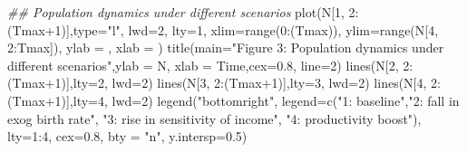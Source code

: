 \documentclass[
  letterpaper,
  DIV=11,
  numbers=noendperiod]{scrreprt}
\newenvironment{Shaded}{\begin{snugshade}}{\end{snugshade}}
\newcommand{\AttributeTok}[1]{\textcolor[rgb]{0.40,0.45,0.13}{#1}}
\newcommand{\DecValTok}[1]{\textcolor[rgb]{0.68,0.00,0.00}{#1}}
\newcommand{\DocumentationTok}[1]{\textcolor[rgb]{0.37,0.37,0.37}{\textit{#1}}}
\newcommand{\FloatTok}[1]{\textcolor[rgb]{0.68,0.00,0.00}{#1}}
\newcommand{\FunctionTok}[1]{\textcolor[rgb]{0.28,0.35,0.67}{#1}}
\newcommand{\NormalTok}[1]{\textcolor[rgb]{0.00,0.23,0.31}{#1}}
\newcommand{\SpecialCharTok}[1]{\textcolor[rgb]{0.37,0.37,0.37}{#1}}
\newcommand{\StringTok}[1]{\textcolor[rgb]{0.13,0.47,0.30}{#1}}
\begin{document}
\begin{Shaded}
\begin{Highlighting}[]
\DocumentationTok{\#\# Population dynamics under different scenarios}
\FunctionTok{plot}\NormalTok{(N[}\DecValTok{1}\NormalTok{, }\DecValTok{2}\SpecialCharTok{:}\NormalTok{(Tmax}\SpecialCharTok{+}\DecValTok{1}\NormalTok{)],}\AttributeTok{type=}\StringTok{"l"}\NormalTok{, }\AttributeTok{lwd=}\DecValTok{2}\NormalTok{, }\AttributeTok{lty=}\DecValTok{1}\NormalTok{, }\AttributeTok{xlim=}\FunctionTok{range}\NormalTok{(}\DecValTok{0}\SpecialCharTok{:}\NormalTok{(Tmax)), }\AttributeTok{ylim=}\FunctionTok{range}\NormalTok{(N[}\DecValTok{4}\NormalTok{, }\DecValTok{2}\SpecialCharTok{:}\NormalTok{Tmax]), }\AttributeTok{ylab =} \StringTok{\textquotesingle{}\textquotesingle{}}\NormalTok{, }\AttributeTok{xlab =} \StringTok{\textquotesingle{}\textquotesingle{}}\NormalTok{)}
\FunctionTok{title}\NormalTok{(}\AttributeTok{main=}\StringTok{"Figure 3: Population dynamics under different scenarios"}\NormalTok{,}\AttributeTok{ylab =} \StringTok{\textquotesingle{}N\textquotesingle{}}\NormalTok{, }\AttributeTok{xlab =} \StringTok{\textquotesingle{}Time\textquotesingle{}}\NormalTok{,}\AttributeTok{cex=}\FloatTok{0.8}\NormalTok{, }\AttributeTok{line=}\DecValTok{2}\NormalTok{)}
\FunctionTok{lines}\NormalTok{(N[}\DecValTok{2}\NormalTok{, }\DecValTok{2}\SpecialCharTok{:}\NormalTok{(Tmax}\SpecialCharTok{+}\DecValTok{1}\NormalTok{)],}\AttributeTok{lty=}\DecValTok{2}\NormalTok{, }\AttributeTok{lwd=}\DecValTok{2}\NormalTok{)}
\FunctionTok{lines}\NormalTok{(N[}\DecValTok{3}\NormalTok{, }\DecValTok{2}\SpecialCharTok{:}\NormalTok{(Tmax}\SpecialCharTok{+}\DecValTok{1}\NormalTok{)],}\AttributeTok{lty=}\DecValTok{3}\NormalTok{, }\AttributeTok{lwd=}\DecValTok{2}\NormalTok{)}
\FunctionTok{lines}\NormalTok{(N[}\DecValTok{4}\NormalTok{, }\DecValTok{2}\SpecialCharTok{:}\NormalTok{(Tmax}\SpecialCharTok{+}\DecValTok{1}\NormalTok{)],}\AttributeTok{lty=}\DecValTok{4}\NormalTok{, }\AttributeTok{lwd=}\DecValTok{2}\NormalTok{)}
\FunctionTok{legend}\NormalTok{(}\StringTok{"bottomright"}\NormalTok{, }\AttributeTok{legend=}\FunctionTok{c}\NormalTok{(}\StringTok{"1: baseline"}\NormalTok{,}\StringTok{"2: fall in exog birth rate"}\NormalTok{, }\StringTok{"3: rise in sensitivity of income"}\NormalTok{,}
      \StringTok{"4: productivity boost"}\NormalTok{), }\AttributeTok{lty=}\DecValTok{1}\SpecialCharTok{:}\DecValTok{4}\NormalTok{, }\AttributeTok{cex=}\FloatTok{0.8}\NormalTok{, }\AttributeTok{bty =} \StringTok{"n"}\NormalTok{, }\AttributeTok{y.intersp=}\FloatTok{0.5}\NormalTok{)}
\end{Highlighting}
\end{Shaded}
\end{document}
